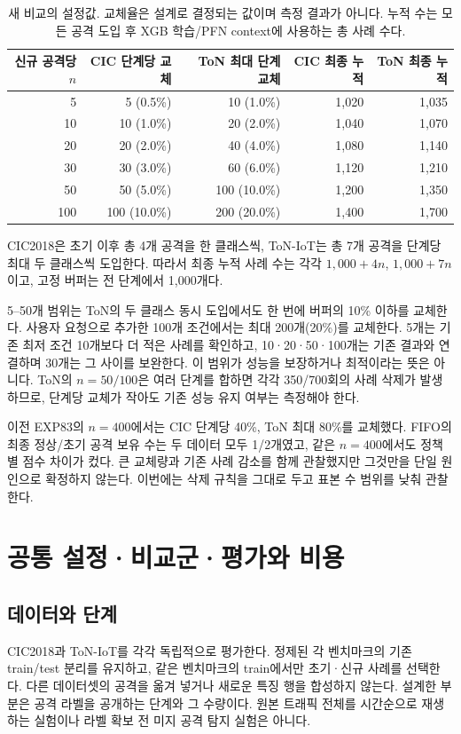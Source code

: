 \begin{table}[H]\centering\small
\caption{새 비교의 설정값. 교체율은 설계로 결정되는 값이며 측정 결과가 아니다. 누적 수는 모든 공격 도입 후 XGB 학습/PFN context에 사용하는 총 사례 수다.}
\begin{tabular}{rrrrr}
\toprule
신규 공격당 $n$ & CIC 단계당 교체 & ToN 최대 단계 교체 & CIC 최종 누적 & ToN 최종 누적\\
\midrule
5  & 5 (0.5\%)  & 10 (1.0\%)  & 1,020 & 1,035\\
10 & 10 (1.0\%) & 20 (2.0\%)  & 1,040 & 1,070\\
20 & 20 (2.0\%) & 40 (4.0\%)  & 1,080 & 1,140\\
30 & 30 (3.0\%) & 60 (6.0\%)  & 1,120 & 1,210\\
50 & 50 (5.0\%) & 100 (10.0\%) & 1,200 & 1,350\\
100 & 100 (10.0\%) & 200 (20.0\%) & 1,400 & 1,700\\
\bottomrule
\end{tabular}
\end{table}
CIC2018은 초기 이후 총 4개 공격을 한 클래스씩, ToN-IoT는 총 7개 공격을 단계당 최대 두 클래스씩 도입한다. 따라서 최종 누적 사례 수는 각각 $1{,}000+4n$, $1{,}000+7n$이고, 고정 버퍼는 전 단계에서 1,000개다.

5--50개 범위는 ToN의 두 클래스 동시 도입에서도 한 번에 버퍼의 10\% 이하를 교체한다. 사용자 요청으로 추가한 100개 조건에서는 최대 200개(20\%)를 교체한다. 5개는 기존 최저 조건 10개보다 더 적은 사례를 확인하고, 10·20·50·100개는 기존 결과와 연결하며 30개는 그 사이를 보완한다. 이 범위가 성능을 보장하거나 최적이라는 뜻은 아니다. ToN의 $n=50/100$은 여러 단계를 합하면 각각 350/700회의 사례 삭제가 발생하므로, 단계당 교체가 작아도 기존 성능 유지 여부는 측정해야 한다.

이전 EXP83의 $n=400$에서는 CIC 단계당 40\%, ToN 최대 80\%를 교체했다. FIFO의 최종 정상/초기 공격 보유 수는 두 데이터 모두 1/2개였고, 같은 $n=400$에서도 정책별 점수 차이가 컸다. 큰 교체량과 기존 사례 감소를 함께 관찰했지만 그것만을 단일 원인으로 확정하지 않는다. 이번에는 삭제 규칙을 그대로 두고 표본 수 범위를 낮춰 관찰한다.

\section{공통 설정·비교군·평가와 비용}
\subsection{데이터와 단계}
CIC2018과 ToN-IoT를 각각 독립적으로 평가한다. 정제된 각 벤치마크의 기존 train/test 분리를 유지하고, 같은 벤치마크의 train에서만 초기·신규 사례를 선택한다. 다른 데이터셋의 공격을 옮겨 넣거나 새로운 특징 행을 합성하지 않는다. 설계한 부분은 공격 라벨을 공개하는 단계와 그 수량이다. 원본 트래픽 전체를 시간순으로 재생하는 실험이나 라벨 확보 전 미지 공격 탐지 실험은 아니다.

